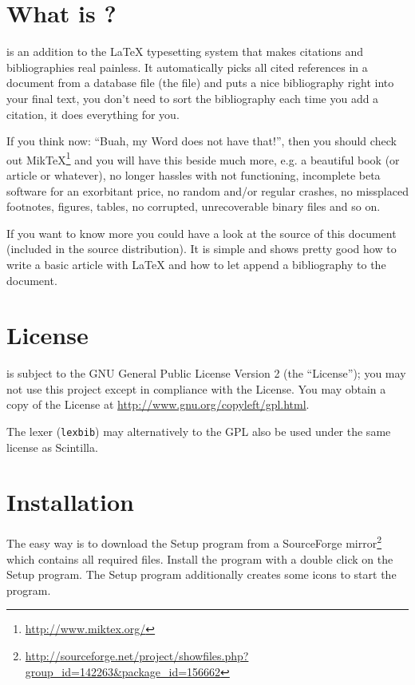 \documentclass[oneside,10pt]{article}
\begin{document}
\section{What is \BibTeX{}?}
\label{sec:WhatIsBibtex}

\BibTeX{} is an addition to the \LaTeX{} typesetting system that makes citations
and bibliographies real painless. It automatically picks all cited references in
a document from a database file (the \BibTeX{} file) and puts a nice bibliography
right into your final text, you don't need to sort the bibliography each time you
add a citation, it does everything for you.

If you think now: ``Buah, my Word\textsuperscript\textregistered{}
does not have that!'', then you should check out
Mik\TeX{}\footnote{\url{http://www.miktex.org/}} and you will have this beside much
more, e.g. a beautiful book \cite[p.~1]{knuth:1984} (or article or whatever), no longer
hassles with not functioning, incomplete beta software for an exorbitant price,
no random and/or regular crashes, no missplaced footnotes, figures, tables, no
corrupted, unrecoverable binary files and so on.

If you want to know more you could have a look at the source of this document
(included in the source distribution). It is simple and shows pretty good how to
write a basic article with \LaTeX{} and how to let \BibTeX{} append a bibliography
to the document.

\section{License}
\label{sec:License}

\BibEdt{} is subject to the GNU General Public License Version 2 (the ``License'');
you may not use this project except in compliance with the License. You may obtain
a copy of the License at \url{http://www.gnu.org/copyleft/gpl.html}.

The \BibTeX{} lexer (\verb|lexbib|) may alternatively to the GPL also be used under the
same license as Scintilla.

\section{Installation}
\label{sec:Installation}

The easy way is to download the Setup program from a SourceForge
mirror\footnote{\url{http://sourceforge.net/project/showfiles.php?group_id=142263&package_id=156662}}
which contains all required files. Install the program with a double click on the
Setup program. The Setup program additionally creates some icons to start the program.
\end{document}
